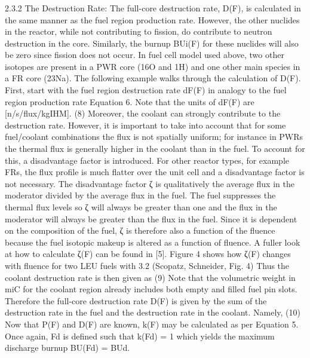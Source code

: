 \subsubsection{}
\label{1g_sec:}
2.3.2 The Destruction Rate:
The full-core destruction rate, D(F), is calculated in the same manner as the fuel region production rate.  However, the other nuclides in the reactor, while not contributing to fission, do contribute to neutron destruction in the core. Similarly, the burnup BUi(F) for these nuclides will also be zero since fission does not occur. In fuel cell model used above, two other isotopes are present in a PWR core (16O and 1H) and one other main species in a FR core (23Na).
The following example walks through the calculation of D(F).  First, start with the fuel region destruction rate dF(F) in analogy to the fuel region production rate Equation 6.  Note that the units of dF(F) are [n/s/flux/kgIHM].  
                                (8)
Moreover, the coolant can strongly contribute to the destruction rate.  However, it is important to take into account that for some fuel/coolant combinations the flux is not spatially uniform; for instance in PWRs the thermal flux is generally higher in the coolant than in the fuel. To account for this, a disadvantage factor is introduced.  For other reactor types, for example FRs, the flux profile is much flatter over the unit cell and a disadvantage factor is not necessary. The disadvantage factor ζ is qualitatively the average flux in the moderator divided by the average flux in the fuel. The fuel suppresses the thermal flux levels so ζ will always be greater than one and the flux in the moderator will always be greater than the flux in the fuel. Since it is dependent on the composition of the fuel, ζ is therefore also a function of the fluence because the fuel isotopic makeup is altered as a function of fluence. A fuller look at how to calculate ζ(F) can be found in [5].  Figure 4 shows how ζ(F) changes with fluence for two LEU fuels with 3.2%
(Scopatz, Schneider, Fig. 4)
Thus the coolant destruction rate is then given as
                        (9)
Note that the volumetric weight in miC for the coolant region already includes both empty and filled fuel pin slots.  Therefore the full-core destruction rate D(F) is given by the sum of the destruction rate in the fuel and the destruction rate in the coolant.  Namely, 
                                (10)
Now that P(F) and D(F) are known, k(F) may be calculated as per Equation 5.  Once again, Fd is defined such that k(Fd) = 1 which yields the maximum discharge burnup BU(Fd) = BUd.



